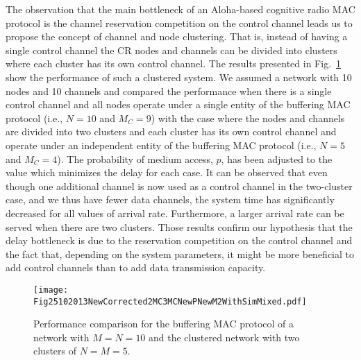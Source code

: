 \documentclass[12pt,journal,oneside,onecolumn]{IEEEtran}
\begin{document}
The observation that the main bottleneck 
of an Aloha-based cognitive radio MAC protocol is the channel reservation competition on 
the control channel  leads us to propose the concept of channel
and node clustering. That is, instead of having a single control channel
the CR nodes and channels can be divided into clusters where each cluster has its own 
control channel. 
The results presented in Fig.~\ref{Fig25102013NewCorrected2MC3MCNewPNewM2WithSim}
show the performance of such a clustered system.
We assumed a network with 10 nodes and 10 channels and compared the performance when there is a single control channel
and all nodes operate under a single entity of the buffering MAC protocol (i.e., $N=10$ and $M_C=9$) with
the case where the nodes and channels are divided into two clusters and
each cluster has its own control channel and operate under an independent 
entity of the buffering MAC protocol (i.e., $N=5$ and $M_C=4$). The probability of medium access, $p$, has been 
adjusted to the value which minimizes the delay for each case.
It can be observed that even though one additional channel is now used as
a control channel in the two-cluster case, and we thus have fewer data channels, the system time 
has significantly decreased for all values of arrival rate. Furthermore, a larger arrival rate can be 
served when there are two clusters. Those results confirm our hypothesis that the delay bottleneck is due to the reservation
competition on the control channel and the
fact that, depending on the system parameters, it might be more beneficial to add control channels than to add
data transmission capacity. 
\begin{figure}\centering
\texttt{[image: Fig25102013NewCorrected2MC3MCNewPNewM2WithSimMixed.pdf]}\\
\caption{Performance comparison for the buffering MAC protocol of a network with $M=N=10$ and the clustered network with two clusters of $N=M=5$.}\label{Fig25102013NewCorrected2MC3MCNewPNewM2WithSim}\end{figure}
\end{document}
